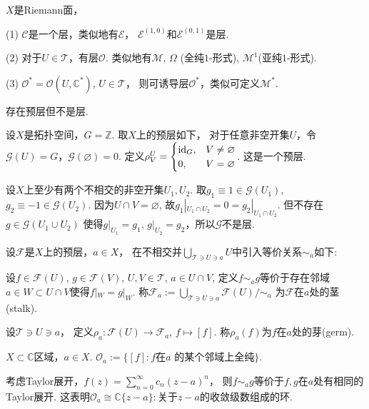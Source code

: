 \begin{example}$X$是Riemann面，

	(1) $\mathcal{C}$是一个层，类似地有$\mathcal{E}$，
    $\mathcal{E}^{(1,0)}$和$\mathcal{E}^{(0,1)}$是层.

	(2) 对于$U\in \mathscr{T}$，有层$\mathcal{O}$. 
    类似地有$\mathscr{M}$, $\Omega$ (全纯$1$-形式), $\mathscr{M}^1$(亚纯$1$-形式).

	(3) $\mathcal{O}^*=\mathcal{O}(U,\mathbb{C}^*)$, $U\in \mathscr{T}$，
    则可诱导层$\mathcal{O}^*$，类似可定义$\mathscr{M}^*$.
\end{example}
		
\begin{example}
	存在预层但不是层.\par
	设$X$是拓扑空间，$G=\mathbb{Z}$. 取$X$上的预层如下，
    对于任意非空开集$U$，令$\mathscr{G}(U)=G$，$\mathscr{G}(\varnothing)=0$. 
    定义$\rho^U_V=\begin{cases} \operatorname{id}_G, &V\neq \varnothing \\ 
        0, &V=\varnothing \end{cases}$. 这是一个预层.
    
	设$X$上至少有两个不相交的非空开集$U_1, U_2$. 
    取$g_1\equiv 1\in \mathscr{G}(U_1)$, $g_2\equiv -1\in \mathscr{G}(U_2)$. 
    因为$U\cap V=\varnothing$, 故$g_1|_{U_1\cap U_2}=0=g_2|_{U_1\cap U_2}$. 
    但不存在$g\in \mathscr{G}(U_1\cup U_2)$
    使得$g|_{U_1}=g_1$, $g|_{U_2}=g_2$，所以$\mathscr{G}$不是层.
\end{example}
		
\begin{definition}
	设$\mathscr{F}$是$X$上的预层，$a\in X$，
    在不相交并$\bigcup\limits_{\mathscr{T}\ni U\ni a} U$中引入等价关系$\sim_a$如下:

	设$f\in \mathscr{F}(U)$, $g\in \mathscr{F}(V)$, 
    $U,V \in \mathscr{T}$, $a\in U\cap V$, 
    定义$f\sim_a g$等价于存在邻域$a\in W\subset U\cap V$使得$f|_W=g|_W$. 
    称$\mathscr{F}_a:=\bigcup_{\mathscr{T}\ni U\ni a} \mathscr{F}(U)/\sim_a$
    为$\mathscr{F}$在$a$处的茎(stalk).

	设$\mathscr{T}\ni U\ni a$，
    定义$\rho_a\colon \mathscr{F}(U)\rightarrow \mathscr{F}_a$, $f\mapsto [f]$. 
    称$\rho_a(f)$为$f$在$a$处的芽(germ).
\end{definition}

\begin{example}
	$X\subset \mathbb{C}$区域，$a\in X$. 
    $\mathcal{O}_a:=\{[f]:f$在$a\text{ 的某个邻域上全纯}\}$.

	考虑Taylor展开，$f(z)=\sum\limits_{n=0}^\infty c_n(z-a)^n$，
    则$f\sim_a g$等价于$f,g$在$a$处有相同的Taylor展开. 
    这表明$\mathcal{O}_a\cong \mathbb{C}\{z-a\}:$关于$z-a$的收敛级数组成的环.
\end{example}
		
